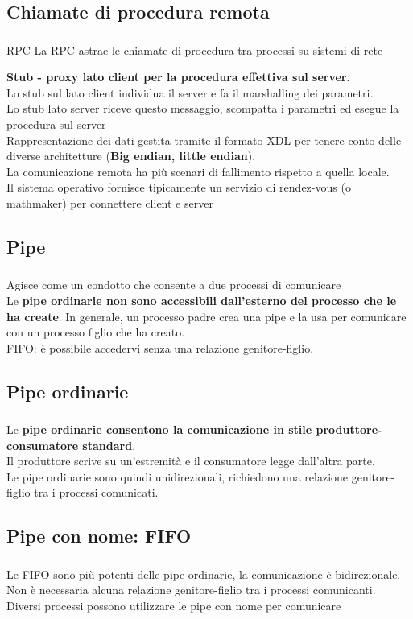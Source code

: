 \documentclass{beamer}
\newenvironment{mainframe}{
	\begin{frame}
		\frametitle{\insertsubsection}
		\framesubtitle{\insertsection}
	}{
	\end{frame}
}
\begin{document}
\subsection{Chiamate di procedura remota}
\begin{mainframe}
	\begin{block}{RPC}
		La RPC astrae le chiamate di procedura tra processi su sistemi di rete
	\end{block}
	\textbf{Stub - proxy lato client per la procedura effettiva sul server}.\\
	Lo stub sul lato client individua il server e fa il marshalling dei parametri.\\
	Lo stub lato server riceve questo messaggio, scompatta i parametri ed esegue la procedura sul server\\
	Rappresentazione dei dati gestita tramite il formato XDL per tenere conto delle diverse architetture (\textbf{Big endian, little endian}).\\
	La comunicazione remota ha più scenari di fallimento rispetto a quella locale.\\
	Il sistema operativo fornisce tipicamente un servizio di rendez-vous (o mathmaker) per connettere client e server
\end{mainframe}
\subsection{Pipe}
\begin{mainframe}
	Agisce come un condotto che consente a due processi di comunicare\\
	Le \textbf{pipe ordinarie non sono accessibili dall'esterno del processo che le ha create}. In generale, un processo padre crea una pipe e la usa per comunicare con un processo figlio che ha creato.\\
	FIFO: è possibile accedervi senza una relazione genitore-figlio.
\end{mainframe}
\subsection{Pipe ordinarie}
\begin{mainframe}
	Le \textbf{pipe ordinarie consentono la comunicazione in stile produttore-consumatore standard}.\\
	Il produttore scrive su un'estremità e il consumatore legge dall'altra parte.\\
	Le pipe ordinarie sono quindi unidirezionali, richiedono una relazione genitore-figlio tra i processi comunicati.
\end{mainframe}
\subsection{Pipe con nome: FIFO}
\begin{mainframe}
	Le FIFO sono più potenti delle pipe ordinarie, la comunicazione è bidirezionale.\\
	Non è necessaria alcuna relazione genitore-figlio tra i processi comunicanti.\\
	Diversi processi possono utilizzare le pipe con nome per comunicare
\end{mainframe}
\end{document}
